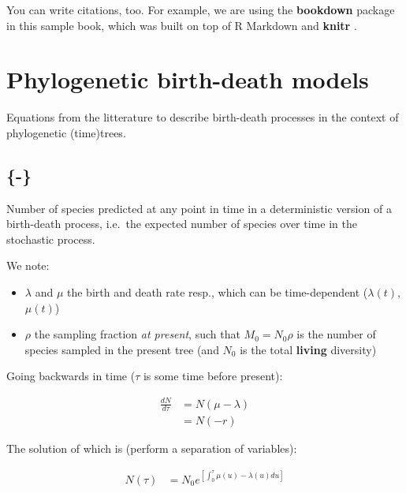 \documentclass[
]{book}
\providecommand{\tightlist}{%
  \setlength{\itemsep}{0pt}\setlength{\parskip}{0pt}}
\theoremstyle{definition}
\theoremstyle{definition}
\theoremstyle{definition}
\theoremstyle{definition}
\theoremstyle{remark}
\begin{document}
You can write citations, too. For example, we are using the \textbf{bookdown} package \citep{R-bookdown} in this sample book, which was built on top of R Markdown and \textbf{knitr} \citep{xie2015}.

\hypertarget{phylogenetic-birth-death-models}{%
\chapter*{Phylogenetic birth-death models}\label{phylogenetic-birth-death-models}}

Equations from the litterature to describe birth-death processes in the context of phylogenetic (time)trees.

\hypertarget{louca}{%
\section{\texorpdfstring{\citet{louca_extant_2020} \{-\}}{@louca\_extant\_2020 \{-\}}}\label{louca}}

Number of species predicted at any point in time in a deterministic version of a birth-death process, i.e.~the expected number of species over time in the stochastic process.

We note:

\begin{itemize}
\tightlist
\item
  \(\lambda\) and \(\mu\) the birth and death rate resp., which can be time-dependent (\(\lambda(t)\), \(\mu(t)\))
\item
  \(\rho\) the sampling fraction \emph{at present}, such that \(M_0 = N_0 \rho\) is the number of species sampled in the present tree (and \(N_0\) is the total \textbf{living} diversity)
\end{itemize}

Going backwards in time (\(\tau\) is some time before present):

\begin{align}
  \frac{dN}{d\tau} &= N(\mu - \lambda) \\
   &= N(-r) \label{eq:nbackwards}
\end{align}

The solution of which is (perform a separation of variables):

\begin{align}
  N(\tau) &= N_{0}e^{\left[ \int_0^\tau \mu(u) - \lambda(u) du \right]} \label{eq:nbalive}
\end{align}
\end{document}
